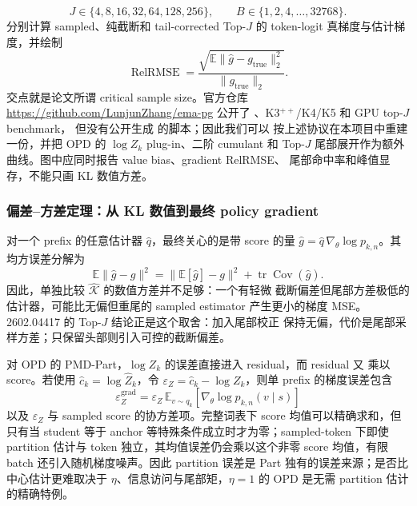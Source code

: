 \documentclass[lang=cn,scheme=chinese,openany]{../book/elegantbook}
\begin{document}
\begin{equation}J\in\{4,8,16,32,64,128,256\},\qquad B\in\{1,2,4,\ldots,32768\}.\end{equation}
分别计算 sampled、纯截断和 tail-corrected Top-$J$ 的 token-logit 真梯度与估计梯度，并绘制
\begin{equation}
\operatorname{RelRMSE}
 =\frac{\sqrt{\mathbb E\lVert\widehat g-g_{\mathrm{true}}\rVert_2^2}}
 {\lVert g_{\mathrm{true}}\rVert_2}.
\end{equation}
交点就是论文所谓 critical sample size。官方仓库 \url{https://github.com/LunjunZhang/ema-pg} 公开了 、K3$^{++}$/K4/K5 和 GPU top-$J$ benchmark， 但没有公开生成  的脚本；因此我们可以 按上述协议在本项目中重建一份，并把 OPD 的 $\log Z_k$ plug-in、二阶 cumulant 和 Top-$J$ 尾部展开作为额外曲线。图中应同时报告 value bias、gradient RelRMSE、 尾部命中率和峰值显存，不能只画 KL 数值方差。

\subsubsection*{偏差--方差定理：从 KL 数值到最终 policy gradient}
对一个 prefix 的任意估计器 $\widehat q$，最终关心的是带 score 的量 $\widehat g=\widehat q\,\nabla_\theta\log p_{k,n}$。其均方误差分解为
\begin{equation}
\mathbb E\lVert\widehat g-g\rVert^2
=\lVert\mathbb E[\widehat g]-g\rVert^2
+\operatorname{tr}\operatorname{Cov}(\widehat g).
\end{equation}
因此，单独比较 $\widehat{\mathcal K}$ 的数值方差并不足够：一个有轻微 截断偏差但尾部方差极低的估计器，可能比无偏但重尾的 sampled estimator 产生更小的梯度 MSE。2602.04417 的 Top-$J$ 结论正是这个取舍：加入尾部校正 保持无偏，代价是尾部采样方差；只保留头部则引入可控的截断偏差。

对 OPD 的 PMD-Part，$\log Z_k$ 的误差直接进入 residual，而 residual 又 乘以 score。若使用 $\widehat c_k=\log\widehat Z_k$，令 $\varepsilon_Z=\widehat c_k-\log Z_k$，则单 prefix 的梯度误差包含
\begin{equation}
\varepsilon_Z^{\mathrm{grad}}
=\varepsilon_Z\,\mathbb E_{v\sim q_k}
\left[\nabla_\theta\log p_{k,n}(v\mid s)\right]
\end{equation}
以及 $\varepsilon_Z$ 与 sampled score 的协方差项。完整词表下 score 均值可以精确求和，但只有当 student 等于 anchor 等特殊条件成立时才为零；sampled-token 下即使 partition 估计与 token 独立，其均值误差仍会乘以这个非零 score 均值，有限 batch 还引入随机梯度噪声。因此 partition 误差是 Part 独有的误差来源；是否比中心估计更难取决于 $\eta$、信息访问与尾部矩，$\eta=1$ 的 OPD 是无需 partition 估计的精确特例。
\end{document}

